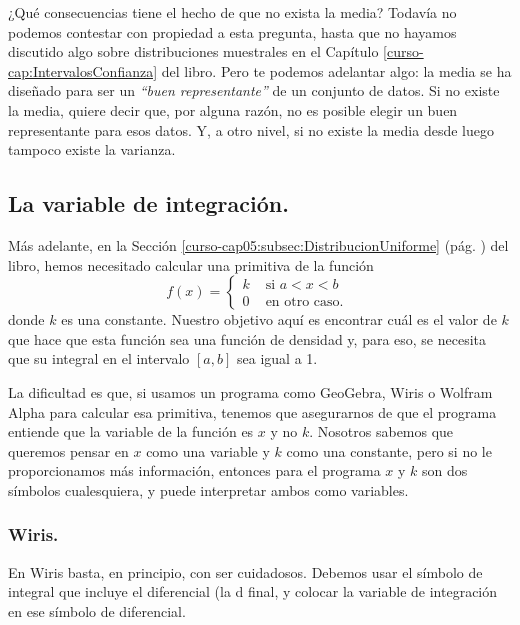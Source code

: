 \documentclass[10pt,a4paper]{article}\usepackage[]{graphicx}\usepackage[]{color}
\newcounter{cont01}
\begin{document}
¿Qué consecuencias tiene el hecho de que no exista la media? Todavía no podemos contestar con propiedad a esta pregunta, hasta que no hayamos discutido algo sobre distribuciones muestrales en el Capítulo \ref{curso-cap:IntervalosConfianza} del libro. Pero te podemos adelantar algo: la media se ha diseñado para ser un {\em ``buen representante''} de un conjunto de datos. Si no existe la media, quiere decir que, por alguna razón, no es posible elegir un buen representante para esos datos. Y, a otro nivel, si no existe la media desde luego tampoco existe la varianza.


\subsection{La variable de integración.}
\label{tut05:subsection:VariableIntegracion}

Más adelante, en la Sección \ref{curso-cap05:subsec:DistribucionUniforme} (pág. \pageref{curso-cap05:subsec:DistribucionUniforme}) del libro, hemos necesitado calcular una primitiva de la función
\[
f(x)=\begin{cases}
k&\mbox{ si }a<x<b\\
0&\mbox{ en otro caso. }
\end{cases}
\]
donde $k$ es una constante. Nuestro objetivo aquí es encontrar cuál es el valor de $k$ que hace que esta función sea una función de densidad y, para eso, se necesita que su integral en el intervalo $[a,b]$ sea igual a 1.

La dificultad es que, si usamos un programa como GeoGebra, Wiris o Wolfram Alpha para calcular esa primitiva, tenemos que asegurarnos de que el programa entiende que la variable de la función es $x$ y no $k$. Nosotros sabemos que queremos pensar en $x$ como una variable y $k$ como una constante, pero si no le proporcionamos más información, entonces para el programa $x$ y $k$ son dos símbolos cualesquiera, y puede interpretar ambos como variables.

\subsubsection*{Wiris.}

En Wiris basta, en principio, con ser cuidadosos. Debemos usar el símbolo de integral que incluye el diferencial (la d final, y  colocar la variable de integración en ese símbolo de diferencial.
\end{document}
